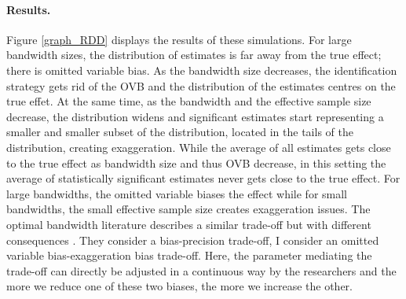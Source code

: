 \documentclass[usletter, 12pt]{article}
\begin{document}
			\paragraph{Results.}  Figure \ref{graph_RDD} displays the results of these simulations.
			For large bandwidth sizes, the distribution of estimates is far away from the true effect; there is omitted variable bias. As the bandwidth size decreases, the identification strategy gets rid of the OVB and the distribution of the estimates centres on the true effet. At the same time, as the bandwidth and the effective sample size decrease, the distribution widens and significant estimates start representing a smaller and smaller subset of the distribution, located in the tails of the distribution, creating exaggeration. %
			While the average of all estimates gets close to the true effect as bandwidth size and thus OVB decrease, in this setting the average of statistically significant estimates never gets close to the true effect. For large bandwidths, the omitted variable biases the effect while for small bandwidths, the small effective sample size creates exaggeration issues. 
			The optimal bandwidth literature describes a similar trade-off but with different consequences \citep{imbens_optimal_2012}. They consider a bias-precision trade-off, I consider an omitted variable bias-exaggeration bias trade-off. Here, the parameter mediating the trade-off can directly be adjusted in a continuous way by the researchers and the more we reduce one of these two biases, the more we increase the other. %
        
\end{document}

